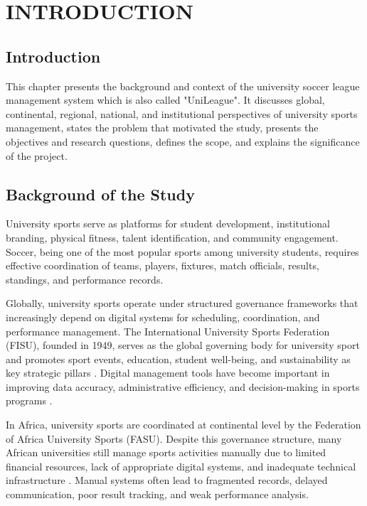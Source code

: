 \documentclass[12pt,a4paper]{report}
\begin{document}
\newpage{}

\chapter{INTRODUCTION}
\section{Introduction}
This chapter presents the background and context of the university soccer league management system which is also called "UniLeague". It discusses global, continental,
regional, national, and institutional perspectives of university sports management, states the
problem that motivated the study, presents the objectives and research questions, defines the
scope, and explains the significance of the project.

\section{Background of the Study}
University sports serve as platforms for student development, institutional branding, physical
fitness, talent identification, and community engagement. Soccer, being one of the most popular
sports among university students, requires effective coordination of teams, players, fixtures,
match officials, results, standings, and performance records.

Globally, university sports operate under structured governance frameworks that increasingly
depend on digital systems for scheduling, coordination, and performance management. The
International University Sports Federation (FISU), founded in 1949, serves as the global
governing body for university sport and promotes sport events, education, student well-being,
and sustainability as key strategic pillars \cite{fisu2023,fisu_strategy2031}. Digital management tools have
become important in improving data accuracy, administrative efficiency, and decision-making
in sports programs \cite{fonti2023}.

In Africa, university sports are coordinated at continental level by the Federation of Africa
University Sports (FASU). Despite this governance structure, many African universities still
manage sports activities manually due to limited financial resources, lack of appropriate digital
systems, and inadequate technical infrastructure \cite{fasu2024}. Manual systems often lead to
fragmented records, delayed communication, poor result tracking, and weak performance analysis.
\end{document}
